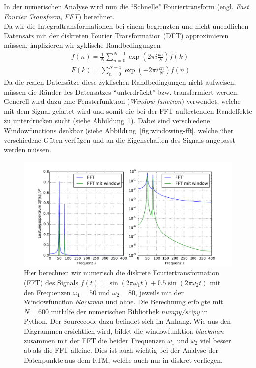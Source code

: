 In der numerischen Analyse wird nun die ``Schnelle''
Fouriertransform (engl. \textit{Fast Fourier Transform, FFT})
berechnet. \\Da wir die Integraltransformationen
bei einem begrenzten und
nicht unendlichen Datensatz mit der
diskreten Fourier Transformation (DFT)
approximieren müssen, implizieren wir zyklische Randbedingungen:
\begin{align}
 &f(n) = \frac{1}{N}\sum_{n=0}^{N-1}{\exp(2\pi i \frac{kn}{N})f(k) }\\
 &F(k) = \sum_{n=0}^{N-1}{\exp(-2\pi i \frac{kn}{N})f(n) }
\end{align}
Da die realen Datensätze diese zyklischen
Randbedingungen nicht aufweisen, müssen
die Ränder des Datensatzes ``unterdrückt'' bzw. transformiert
werden. Generell wird dazu eine Fensterfunktion (\textit{Window
function}) verwendet, welche mit dem Signal gefaltet wird und
somit die bei der FFT auftretenden Randeffekte zu unterdrücken 
sucht (siehe Abbildung~\ref{fig:stm2}). 
Dabei sind verschiedene Windowfunctions
denkbar (siehe Abbildung~\ref{fig:windowing-fft},
welche über verschiedene
Güten verfügen und an die Eigenschaften
des Signals angepasst werden müssen.
\begin{figure}
\includegraphics[width=17cm]{pics/stm2}
\caption{Hier berechnen wir numerisch die diskrete
    Fouriertransformation (FFT) des Signals  
$f(t)=\sin(2\pi \omega_1 t) + 0.5 \sin(2\pi \omega_2 t)$ mit den 
Frequenzen $\omega_1 = 50$ und $\omega_2 = 80$, jeweils mit
der Windowfunction \textit{blackman} und ohne. 
Die Berechnung erfolgte mit $N=600$ mithilfe der numerischen
Bibliothek \textit{numpy/scipy} in Python\cite{scipy_reference}.
Der Sourcecode dazu befindet sich im Anhang.
Wie aus den Diagrammen ersichtlich wird, bildet die windowfunktion
\textit{blackman} zusammen mit der FFT
die  beiden Frequenzen $\omega_1$ und $\omega_2$ viel besser ab
als die FFT alleine. Dies ist auch wichtig bei der Analyse der
Datenpunkte aus dem RTM, welche auch nur in diskret vorliegen.
}
 \label{fig:stm2}
\end{figure}

